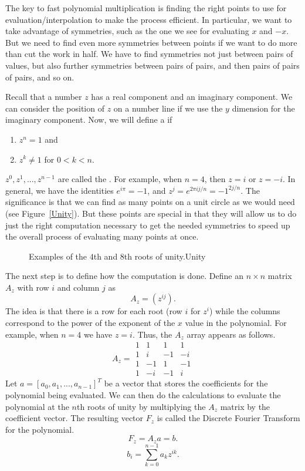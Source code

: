 The key to fast polynomial multiplication is finding the right points
to use for evaluation/interpolation to make the process efficient.
In particular, we want to take advantage of symmetries, such as the
one we see for evaluating $x$ and $-x$.
But we need to find even more symmetries between points if we want to
do more than cut the work in half.
We have to find symmetries not just between pairs of values,
but also further symmetries between pairs of pairs, and then pairs of
pairs of pairs, and so on.

Recall that a  number $z$
has a real component and an imaginary component.
We can consider the position of $z$ on a number line if we use the $y$
dimension for the imaginary component.
Now, we will define a  if
\begin{enumerate}
\item $z^n = 1$ and
\item $z^k \neq 1$ for $0 < k < n$.
\end{enumerate}
$z^0, z^1, ..., z^{n-1}$ are called the
.
For example, when $n=4$, then $z = i$ or $z = -i$.
In general, we have the identities $e^{i\pi} = -1$, 
and $z^j = e^{2\pi ij/n} = -1^{2j/n}$.
The significance is that we can find as many points on a unit circle
as we would need
(see Figure~\ref{Unity}).
But these points are special in that they will allow us to do just the
right computation necessary to get the needed symmetries to speed up
the overall process of evaluating many points at once.

\begin{figure}
\vspace{-\bigskipamount}
\vspace{-\bigskipamount}
{Examples of the $4$th and $8$th roots of unity.}{Unity}
\end{figure}

The next step is to define how the computation is done.
Define an $n \times n$ matrix $A_{z}$ with row $i$ and column $j$
as \[A_{z} = (z^{ij}).\]
The idea is that there is a row for each root (row $i$ for $z^i$)
while the columns correspond to the power of the exponent of the $x$
value in the polynomial.
For example, when $n = 4$ we have $z = i$.
Thus, the $A_{z}$ array appears as follows.
\[A_{z} =
\begin{array}{rrrr}
1&1&1&1\\
1&i&-1&-i\\
1&-1&1&-1\\
1&-i&-1&i
\end{array}
\]
Let $a = [a_0, a_1, ..., a_{n-1}]^T$ be a vector that stores the
coefficients for the polynomial being evaluated.
We can then do the calculations to evaluate the polynomial at the
$n$th roots of unity by multiplying the $A_{z}$ matrix by the
coefficient vector.
The resulting vector $F_{z}$ is called the Discrete Fourier Transform
for the polynomial.
\[F_{z} = A_{z}a = b.\]
\[b_i = \sum_{k=0}^{n-1} a_kz^{ik}.\]

